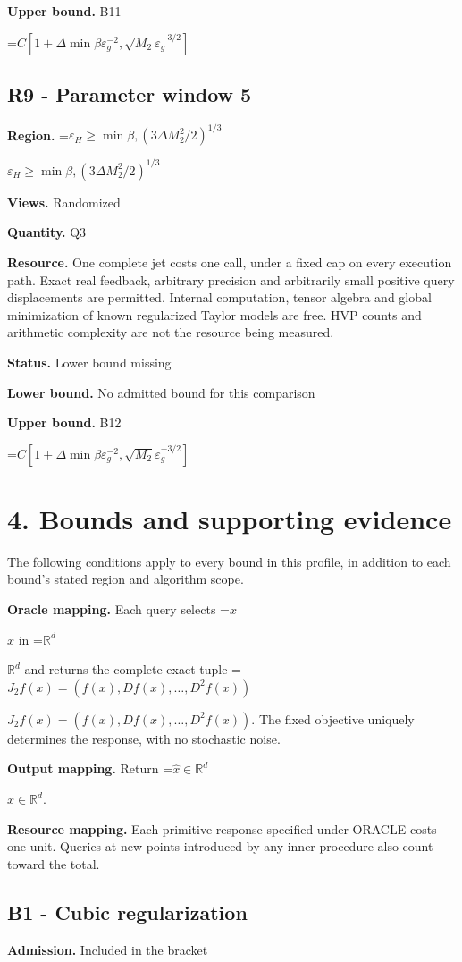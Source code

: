 \documentclass[10pt,a4paper]{article}
\newcommand{\AtlasMath}[1]{\par\begingroup\centering\setbox0=\hbox{$\displaystyle #1$}\ifdim\wd0>1.4\linewidth\typeout{ATLAS WIDE FORMULA: \the\wd0}\fi\ifdim\wd0>\linewidth\resizebox{\linewidth}{!}{\box0}\else\box0\fi\par\endgroup}
\newcommand{\AtlasInlineMath}[1]{\begingroup\setbox0=\hbox{$#1$}\ifdim\wd0>.4\linewidth\endgroup\AtlasMath{#1}\else\endgroup$#1$\fi}
\begin{document}
\textbf{Upper bound.} B11

\AtlasMath{C[1+\Delta \min{\beta\varepsilon_g^{-2},\sqrt{M_2}\varepsilon_g^{-3/2}}]}
\subsection{R9 - Parameter window 5}
\textbf{Region.} \AtlasInlineMath{\varepsilon_H\ge \min{\beta,(3\Delta M_2^2/2)^{1/3}}}

\textbf{Views.} Randomized

\textbf{Quantity.} Q3

\textbf{Resource.} One complete jet costs one call, under a fixed cap on every execution path. Exact real feedback, arbitrary precision and arbitrarily small positive query displacements are permitted. Internal computation, tensor algebra and global minimization of known regularized Taylor models are free. HVP counts and arithmetic complexity are not the resource being measured.

\textbf{Status.} Lower bound missing

\textbf{Lower bound.} No admitted bound for this comparison

\textbf{Upper bound.} B12

\AtlasMath{C[1+\Delta \min{\beta\varepsilon_g^{-2},\sqrt{M_2}\varepsilon_g^{-3/2}}]}
\section{4. Bounds and supporting evidence}
The following conditions apply to every bound in this profile, in addition to each bound's stated region and algorithm scope.

\textbf{Oracle mapping.} Each query selects \AtlasInlineMath{x} in \AtlasInlineMath{\mathbb{R}^d} and returns the complete exact tuple \AtlasInlineMath{J_{2}f(x)=(f(x),Df(x),\ldots,D^{2}f(x))}. The fixed objective uniquely determines the response, with no stochastic noise.

\textbf{Output mapping.} Return \AtlasInlineMath{\widehat{x}\in \mathbb{R}^d}.

\textbf{Resource mapping.} Each primitive response specified under ORACLE costs one unit. Queries at new points introduced by any inner procedure also count toward the total.

\subsection{B1 - Cubic regularization}
\textbf{Admission.} Included in the bracket
\end{document}
